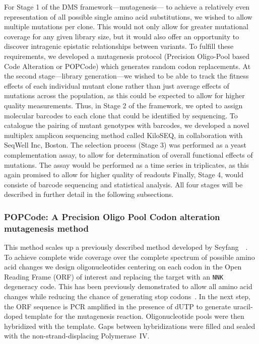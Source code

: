 For Stage 1 of the DMS framework---mutagenesis--- to achieve a relatively even representation of all possible single amino acid substitutions, we wished to allow multiple mutations per clone. This would not only allow for greater mutational coverage for any given library size, but it would also offer an opportunity to discover intragenic epistatic relationships between variants.  To fulfill these requirements, we developed a mutagenesis protocol (Precision Oligo-Pool based Code Alteration or POPCode) which generates random codon replacements. 
At the second stage---library generation---we wished to be able to track the fitness effects of each individual mutant clone rather than just average effects of mutations across the population, as this could be expected to allow for higher quality measurements. Thus, in Stage 2 of the framework, we opted to assign molecular barcodes to each clone that could be identified by sequencing. To catalogue the pairing of mutant genotypes with barcodes, we developed a novel multiplex amplicon sequencing method called KiloSEQ, in collaboration with SeqWell Inc, Boston. 
The selection process (Stage 3) was performed as a yeast complementation assay, to allow for determination of overall functional effects of mutations. The assay would be performed as a time series in triplicates, as this again promised to allow for higher quality of readouts 
Finally, Stage 4, would consiste of barcode sequencing and statistical analysis. All four stages will be described in further detail in the following subsections.


\subsubsection{POPCode: A Precision Oligo Pool Codon alteration mutagenesis method}

This method scales up a previously described method developed by Seyfang~\etal~\cite{seyfang}. To achieve complete wide coverage over the complete spectrum of possible amino acid changes we design oligonucleotides centering on each codon in the Open Reading Frame (ORF) of interest and replacing the target with an \texttt{NNK} degeneracy code. This has been previously demonstrated to allow all amino acid changes while reducing the chance of generating stop codons~\cite{36}. 
In the next step, the ORF sequence is PCR amplified in the presence of dUTP to generate uracil-doped template for the mutagenesis reaction. Oligonucleotide pools were then hybridized with the template. Gaps between hybridizations were filled and sealed with the non-strand-displacing  Polymerase~IV. 

